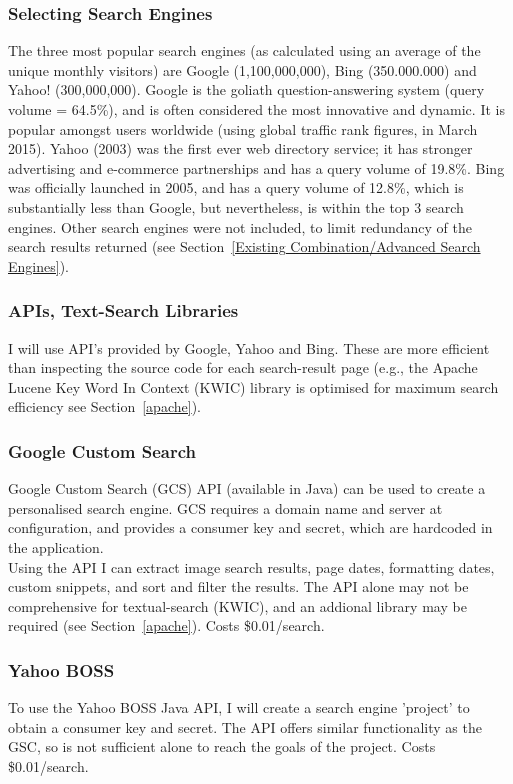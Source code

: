 \documentclass[a4paper, 10pt]{article}
\begin{document}
\subsubsection{Selecting Search Engines} 
The three most popular search engines (as calculated using an average of the unique monthly visitors) are Google (1,100,000,000), Bing (350.000.000) and Yahoo! (300,000,000)\cite{ebiz}. Google is the goliath question-answering system (query volume = 64.5\%)\cite{adam}, and is often considered the most innovative and dynamic. It is popular amongst users worldwide (using global traffic rank figures, in March 2015). Yahoo (2003) was the first ever web directory service; it has stronger advertising and e-commerce partnerships and has a query volume of 19.8\%. Bing was officially launched in 2005, and has a query volume of 12.8\%, which is substantially less than Google, but nevertheless, is within the top 3 search engines. Other search engines were not included, to limit redundancy of the search results returned (see Section~\ref{Existing Combination/Advanced Search Engines}). 

\subsubsection{APIs, Text-Search Libraries}
I will use API’s provided by Google, Yahoo and Bing. These are more efficient than inspecting the source code for each search-result page (e.g., the Apache Lucene Key Word In Context (KWIC) library is optimised for maximum search efficiency see Section~\ref{apache}). 

\subsubsection{Google Custom Search}
Google Custom Search (GCS) API (available in Java) can be used to create a personalised search engine. GCS requires a domain name and server at configuration, and provides a consumer key and secret, which are hardcoded in the application.\\
Using the API I can extract image search results, page dates, formatting dates, custom snippets, and sort and filter the results. The API alone may not be comprehensive for textual-search (KWIC), and an addional library may be required (see Section~\ref{apache}). Costs \$0.01/search.

\subsubsection{Yahoo BOSS}
To use the Yahoo BOSS Java API, I will create a search engine 'project' to obtain a consumer key and secret. The API offers similar functionality as the GSC, so is not sufficient alone to reach the goals of the project. Costs \$0.01/search.
\end{document}
